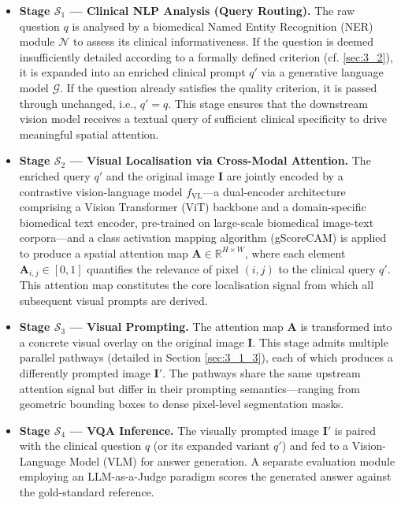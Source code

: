 \begin{itemize}
    \item \textbf{Stage $\mathcal{S}_1$ --- Clinical NLP Analysis (Query Routing).} The raw question $q$ is analysed by a biomedical Named Entity Recognition (NER) module $\mathcal{N}$ to assess its clinical informativeness. If the question is deemed insufficiently detailed according to a formally defined criterion (cf. \ref{sec:3_2}), it is expanded into an enriched clinical prompt $q'$ via a generative language model $\mathcal{G}$. If the question already satisfies the quality criterion, it is passed through unchanged, i.e., $q' = q$. This stage ensures that the downstream vision model receives a textual query of sufficient clinical specificity to drive meaningful spatial attention.

    \item \textbf{Stage $\mathcal{S}_2$ --- Visual Localisation via Cross-Modal Attention.} The enriched query $q'$ and the original image $\mathbf{I}$ are jointly encoded by a contrastive vision-language model $f_{\text{VL}}$---a dual-encoder architecture comprising a Vision Transformer (ViT) backbone and a domain-specific biomedical text encoder, pre-trained on large-scale biomedical image-text corpora---and a class activation mapping algorithm (gScoreCAM) is applied to produce a spatial attention map $\mathbf{A} \in \mathbb{R}^{H \times W}$, where each element $\mathbf{A}_{i,j} \in [0, 1]$ quantifies the relevance of pixel $(i, j)$ to the clinical query $q'$. This attention map constitutes the core localisation signal from which all subsequent visual prompts are derived.

    \item \textbf{Stage $\mathcal{S}_3$ --- Visual Prompting.} The attention map $\mathbf{A}$ is transformed into a concrete visual overlay on the original image $\mathbf{I}$. This stage admits multiple parallel pathways (detailed in Section \ref{sec:3_1_3}), each of which produces a differently prompted image $\mathbf{I}'$. The pathways share the same upstream attention signal but differ in their prompting semantics---ranging from geometric bounding boxes to dense pixel-level segmentation masks.

    \item \textbf{Stage $\mathcal{S}_4$ --- VQA Inference.} The visually prompted image $\mathbf{I}'$ is paired with the clinical question $q$ (or its expanded variant $q'$) and fed to a Vision-Language Model (VLM) for answer generation. A separate evaluation module employing an LLM-as-a-Judge paradigm scores the generated answer against the gold-standard reference.
\end{itemize}

